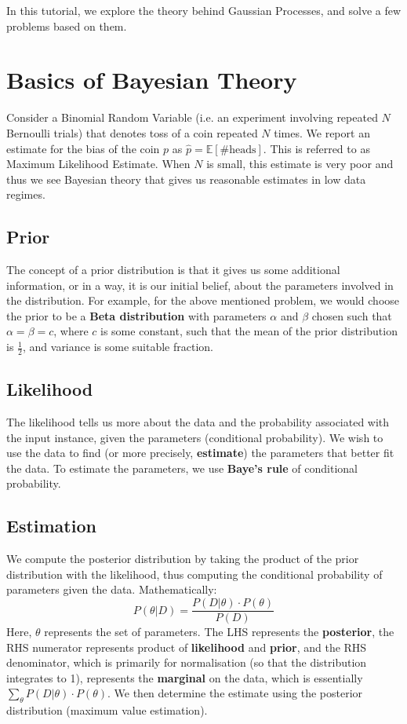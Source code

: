 \documentclass[12pt]{article}
\begin{document}
	\MakeScribeTop

\noindent In this tutorial, we explore the theory behind Gaussian Processes, and solve a few problems based on them.

\section{Basics of Bayesian Theory}

Consider a Binomial Random Variable (i.e. an experiment involving repeated $N$ Bernoulli trials) that denotes toss of a coin repeated $N$ times. We report an estimate for the bias of the coin $p$ as $\hat{p} = \mathbb{E}\left[\# \text{heads}\right]$. This is referred to as Maximum Likelihood Estimate. When $N$ is small, this estimate is very poor and thus we see Bayesian theory that gives us reasonable estimates in low data regimes.

\subsection{Prior}

The concept of a prior distribution is that it gives us some additional information, or in a way, it is our initial belief, about the parameters involved in the distribution. For example, for the above mentioned problem, we would choose the prior to be a \textbf{Beta distribution} with parameters $\alpha$ and $\beta$ chosen such that $\alpha = \beta = c$, where $c$ is some constant, such that the mean of the prior distribution is $\displaystyle \frac{1}{2}$, and variance is some suitable fraction.

\subsection{Likelihood}

The likelihood tells us more about the data and the probability associated with the input instance, given the parameters (conditional probability). We wish to use the data to find (or more precisely, \textbf{estimate}) the parameters that better fit the data. To estimate the parameters, we use \textbf{Baye's rule} of conditional probability.

\subsection{Estimation}

We compute the posterior distribution by taking the product of the prior distribution with the likelihood, thus computing the conditional probability of parameters given the data. Mathematically: \[ P(\theta|D) = \frac{P(D|\theta) \cdot P(\theta)}{P(D)} \]
Here, $\theta$ represents the set of parameters. The LHS represents the \textbf{posterior}, the RHS numerator represents product of \textbf{likelihood} and \textbf{prior}, and the RHS denominator, which is primarily for normalisation (so that the distribution integrates to 1), represents the \textbf{marginal} on the data, which is essentially $\displaystyle \sum_{\theta} P(D|\theta) \cdot P(\theta)$. We then determine the estimate using the posterior distribution (maximum value estimation).
\end{document}
